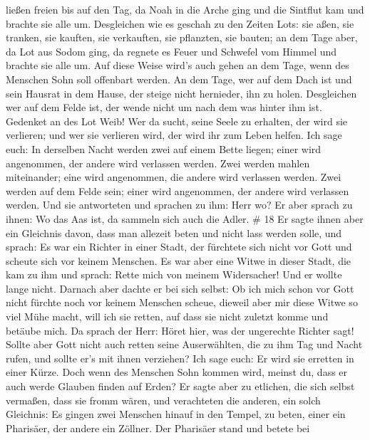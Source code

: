 ließen freien bis auf den Tag, da Noah in die Arche ging und die
Sintflut kam und brachte sie alle um.  Desgleichen wie es
geschah zu den Zeiten Lots: sie aßen, sie tranken, sie kauften, sie
verkauften, sie pflanzten, sie bauten;  an dem Tage aber,
da Lot aus Sodom ging, da regnete es Feuer und Schwefel vom Himmel und
brachte sie alle um.  Auf diese Weise wird's auch gehen an
dem Tage, wenn des Menschen Sohn soll offenbart werden.  An
dem Tage, wer auf dem Dach ist und sein Hausrat in dem Hause, der steige
nicht hernieder, ihn zu holen. Desgleichen wer auf dem Felde ist, der
wende nicht um nach dem was hinter ihm ist.  Gedenket an
des Lot Weib!  Wer da sucht, seine Seele zu erhalten, der
wird sie verlieren; und wer sie verlieren wird, der wird ihr zum Leben
helfen.  Ich sage euch: In derselben Nacht werden zwei auf
einem Bette liegen; einer wird angenommen, der andere wird verlassen
werden.  Zwei werden mahlen miteinander; eine wird
angenommen, die andere wird verlassen werden.  Zwei werden
auf dem Felde sein; einer wird angenommen, der andere wird verlassen
werden.  Und sie antworteten und sprachen zu ihm: Herr wo?
Er aber sprach zu ihnen: Wo das Aas ist, da sammeln sich auch die Adler.
\# 18  Er sagte ihnen aber ein Gleichnis davon, dass man
allezeit beten und nicht lass werden solle,  und sprach: Es
war ein Richter in einer Stadt, der fürchtete sich nicht vor Gott und
scheute sich vor keinem Menschen.  Es war aber eine Witwe in
dieser Stadt, die kam zu ihm und sprach: Rette mich von meinem
Widersacher!  Und er wollte lange nicht. Darnach aber dachte
er bei sich selbst: Ob ich mich schon vor Gott nicht fürchte noch vor
keinem Menschen scheue,  dieweil aber mir diese Witwe so
viel Mühe macht, will ich sie retten, auf dass sie nicht zuletzt komme
und betäube mich.  Da sprach der Herr: Höret hier, was der
ungerechte Richter sagt!  Sollte aber Gott nicht auch retten
seine Auserwählten, die zu ihm Tag und Nacht rufen, und sollte er's mit
ihnen verziehen?  Ich sage euch: Er wird sie erretten in
einer Kürze. Doch wenn des Menschen Sohn kommen wird, meinst du, dass er
auch werde Glauben finden auf Erden?  Er sagte aber zu
etlichen, die sich selbst vermaßen, dass sie fromm wären, und
verachteten die anderen, ein solch Gleichnis:  Es gingen
zwei Menschen hinauf in den Tempel, zu beten, einer ein Pharisäer, der
andere ein Zöllner.  Der Pharisäer stand und betete bei
